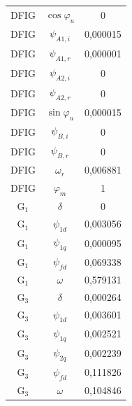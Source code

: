 \begin{longtable}{c c c}
	DFIG & $\cos\varphi_u$ & 0         \\
	DFIG & $\psi_{A1,i}$ & 0,000015  \\
	DFIG & $\psi_{A1,r}$ & 0,000001  \\
	DFIG & $\psi_{A2,i}$ & 0         \\
	DFIG & $\psi_{A2,r}$ & 0         \\
	DFIG & $\sin\varphi_u$ & 0,000015  \\
	DFIG & $\psi_{B,i}$ & 0         \\
	DFIG & $\psi_{B,r}$ & 0         \\
	DFIG & $\omega_r$ & 0,006881  \\
	DFIG & $\varphi_m$ & 1         \\
	G$_1$ & $\delta$ & 0         \\
	G$_1$ & $\psi_{1d}$ & 0,003056  \\
	G$_1$ & $\psi_{1q}$ & 0,000095  \\
	G$_1$ & $\psi_{fd}$ & 0,069338  \\
	G$_1$ & $\omega$ & 0,579131  \\
	G$_3$ & $\delta$ & 0,000264  \\
	G$_3$ & $\psi_{1d}$ & 0,003601  \\
	G$_3$ & $\psi_{1q}$ & 0,002521  \\
	G$_3$ & $\psi_{2q}$ & 0,002239  \\
	G$_3$ & $\psi_{fd}$ & 0,111826  \\
	G$_3$ & $\omega$ & 0,104846  \\
\end{longtable}
\par
\endgroup

